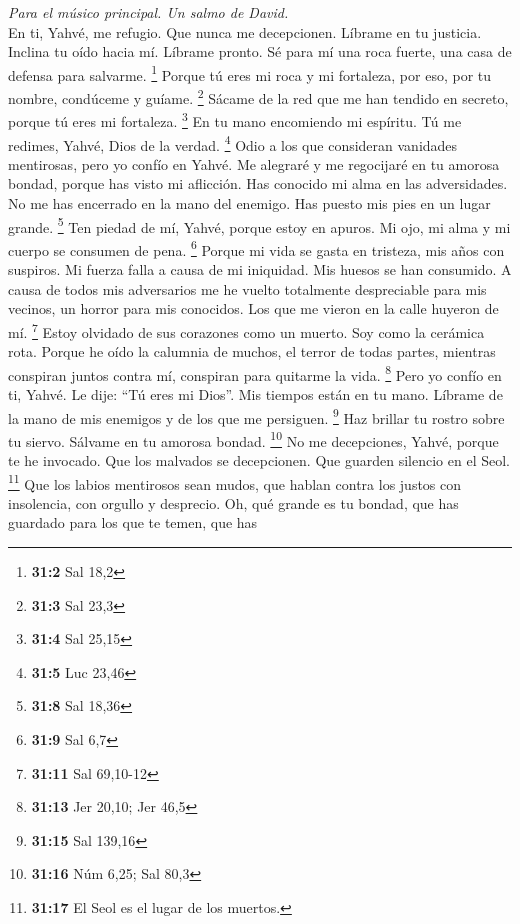\begin{paracol}{2}
\emph{Para el músico principal. Un salmo de David.}\\
 En ti, Yahvé, me refugio. Que nunca me decepcionen.
Líbrame en tu justicia.  Inclina tu oído hacia mí. Líbrame
pronto. Sé para mí una roca fuerte, una casa de defensa para salvarme.
\footnote{\textbf{31:2} Sal 18,2}  Porque tú eres mi roca
y mi fortaleza, por eso, por tu nombre, condúceme y guíame. \footnote{\textbf{31:3}
  Sal 23,3}  Sácame de la red que me han tendido en
secreto, porque tú eres mi fortaleza. \footnote{\textbf{31:4} Sal 25,15}
 En tu mano encomiendo mi espíritu. Tú me redimes, Yahvé,
Dios de la verdad. \footnote{\textbf{31:5} Luc 23,46} 
Odio a los que consideran vanidades mentirosas, pero yo confío en Yahvé.
 Me alegraré y me regocijaré en tu amorosa bondad, porque
has visto mi aflicción. Has conocido mi alma en las adversidades.
 No me has encerrado en la mano del enemigo. Has puesto
mis pies en un lugar grande. \footnote{\textbf{31:8} Sal 18,36}
 Ten piedad de mí, Yahvé, porque estoy en apuros. Mi ojo,
mi alma y mi cuerpo se consumen de pena. \footnote{\textbf{31:9} Sal 6,7}
 Porque mi vida se gasta en tristeza, mis años con
suspiros. Mi fuerza falla a causa de mi iniquidad. Mis huesos se han
consumido.  A causa de todos mis adversarios me he vuelto
totalmente despreciable para mis vecinos, un horror para mis conocidos.
Los que me vieron en la calle huyeron de mí. \footnote{\textbf{31:11}
  Sal 69,10-12}  Estoy olvidado de sus corazones como un
muerto. Soy como la cerámica rota.  Porque he oído la
calumnia de muchos, el terror de todas partes, mientras conspiran juntos
contra mí, conspiran para quitarme la vida. \footnote{\textbf{31:13} Jer
  20,10; Jer 46,5}  Pero yo confío en ti, Yahvé. Le dije:
``Tú eres mi Dios''.  Mis tiempos están en tu mano.
Líbrame de la mano de mis enemigos y de los que me persiguen.
\footnote{\textbf{31:15} Sal 139,16}  Haz brillar tu
rostro sobre tu siervo. Sálvame en tu amorosa bondad. \footnote{\textbf{31:16}
  Núm 6,25; Sal 80,3}  No me decepciones, Yahvé, porque
te he invocado. Que los malvados se decepcionen. Que guarden silencio en
el Seol. \footnote{\textbf{31:17} El Seol es el lugar de los muertos.}
 Que los labios mentirosos sean mudos, que hablan contra
los justos con insolencia, con orgullo y desprecio.  Oh,
qué grande es tu bondad, que has guardado para los que te temen, que has

\end{paracol}
